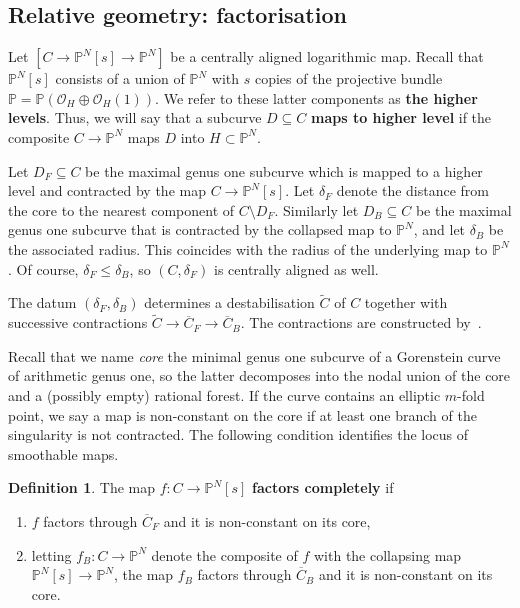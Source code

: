\documentclass[11pt]{amsart}
\newcommand{\PP}{\mathbb P}
\renewcommand{\to}{\rightarrow}
\theoremstyle{definition}
\theoremstyle{definition}
\newtheorem{definition}[thm]{Definition}
\begin{document}
\subsection{Relative geometry: factorisation}\label{subsection factorisation} Let $[C\to \mathbb P^N[s]\to \mathbb P^N]$ be a centrally aligned logarithmic map. Recall that $\mathbb P^N[s]$ consists of a union of $\mathbb P^N$ with $s$ copies of the projective bundle $\mathbb{P} = \mathbb P(\mathcal O_H\oplus \mathcal O_H(1))$. We refer to these latter components as \textbf{the higher levels}. Thus, we will say that a subcurve $D\subseteq C$ \textbf{maps to higher level} if the composite $C\to \mathbb P^N$ maps $D$ into $H\subset \mathbb P^N$. 

Let $D_F\subseteq C$ be the maximal genus one subcurve which is mapped to a higher level and contracted by the map $C\to \mathbb P^N[s]$. Let $\delta_F$ denote the distance from the core to the nearest component of $C \setminus D_F$. Similarly let $D_B\subseteq C$ be the maximal genus one subcurve that is contracted by the collapsed map to $\mathbb P^N$, and let $\delta_B$ be the associated radius. This coincides with the radius of the underlying map to $\mathbb P^N$. Of course, $\delta_F\leq \delta_B$, so $(C,\delta_F)$ is centrally aligned as well.

The datum $(\delta_F,\delta_B)$ determines a destabilisation $\widetilde C$ of $C$ together with successive contractions $\widetilde C\to \overline C_F\to\overline C_B$. The contractions are constructed by~\cite[Section~3]{RSPW}.

Recall that we name \emph{core} the minimal genus one subcurve of a Gorenstein curve of arithmetic genus one, so the latter decomposes into the nodal union of the core and a (possibly empty) rational forest. If the curve contains an elliptic $m$-fold point, we say a map is non-constant on the core if at least one branch of the singularity is not contracted.
The following condition identifies the locus of smoothable maps. 

\begin{definition}
The map $f\colon C\to \mathbb P^N[s]$ \textbf{factors completely} if 
\begin{enumerate}
\item $f$ factors through $\overline C_F$ and it is non-constant on its core,
\item letting $f_B\colon C\to\PP^N$ denote the composite of $f$ with the collapsing map $\mathbb P^N[s]\to\mathbb P^N$, the map $f_B$ factors through $\overline C_B$ and it is non-constant on its core.
\end{enumerate}
\end{definition}
\end{document}
